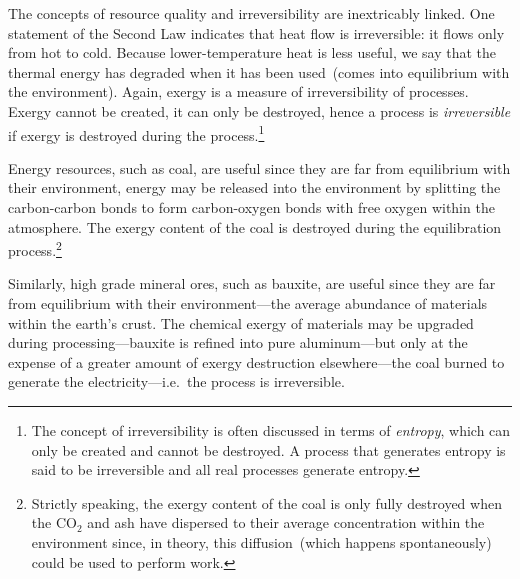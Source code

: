 The concepts of resource quality and irreversibility are inextricably linked.
One statement of the Second Law
indicates that heat flow is irreversible: 
it flows only from hot to cold. 
Because lower-temperature heat is less useful, 
we say that the thermal energy has 
degraded when it has been used~(comes 
into equilibrium with the environment).
Again,
exergy is a measure of irreversibility of processes.
Exergy cannot be created, it can only be destroyed,
hence a process is \emph{irreversible}
if exergy is destroyed during the process.\footnote{The concept of
irreversibility is often discussed in terms of \emph{entropy},
which can only be created and cannot be destroyed.
A process that generates entropy is said to be irreversible
and all real processes generate entropy.}



Energy resources, such as coal, are useful
since they are far from equilibrium with their environment,
energy may be released into the environment by
splitting the carbon-carbon bonds to form 
carbon-oxygen bonds with free oxygen 
within the atmosphere.
The exergy content of the coal is destroyed during
the equilibration process.\footnote{Strictly speaking,
the exergy content of the coal is only fully destroyed
when the CO$_2$ and ash have dispersed to their average
concentration within the environment since,
in theory,
this diffusion~(which happens spontaneously) 
could be used to perform work.}

Similarly, high grade mineral ores, such as bauxite, 
are useful since they are far from equilibrium with their
environment---the average abundance of materials
within the earth's crust.
The chemical exergy of materials may be upgraded
during processing---bauxite is refined into pure 
aluminum---but only at the expense of a greater
amount of exergy destruction elsewhere---the coal
burned to generate the electricity---i.e.\ the process is irreversible.

